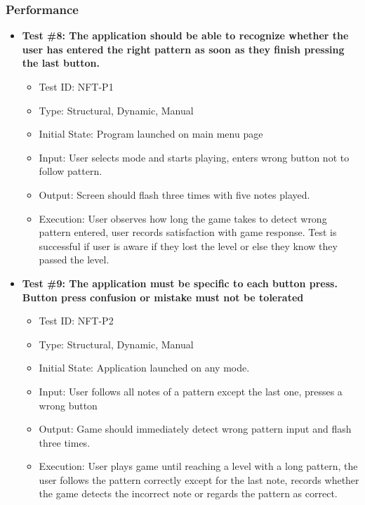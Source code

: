 \documentclass[12pt, titlepage]{article}
\begin{document}
\subsubsection{Performance}
\begin{itemize}
\item \textbf{Test \#8: The application should be able to recognize whether the user has entered the right pattern as soon as they finish pressing the last button.}
\begin{itemize}
\item Test ID: NFT-P1
\item Type: Structural, Dynamic, Manual				
\item Initial State: Program launched on main menu page		
\item Input: User selects mode and starts playing, enters wrong button not to follow pattern.
\item Output: Screen should flash three times with five notes played.		
\item Execution: User observes how long the game takes to detect wrong pattern entered, user records satisfaction with game response. Test is successful if user is aware if they lost the level or else they know they passed the level.
\end{itemize}

\item \textbf{Test \#9: The application must be specific to each button press. Button press confusion or mistake must not be tolerated}
\begin{itemize}
\item Test ID: NFT-P2
\item Type: Structural, Dynamic, Manual			
\item Initial State: Application launched on any mode.			
\item Input: User follows all notes of a pattern except the last one, presses a wrong button			
\item Output: Game should immediately detect wrong pattern input and flash three times.				
\item Execution: User plays game until reaching a level with a long pattern, the user follows the pattern correctly except for the last note, records whether the game detects the incorrect note or regards the pattern as correct.
\end{itemize}


\end{itemize}
\end{document}
